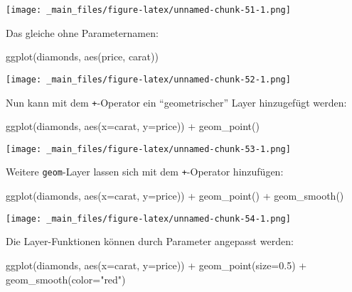 \documentclass[
  ngerman,
]{article}
\newenvironment{Shaded}{\begin{snugshade}}{\end{snugshade}}
\newcommand{\AttributeTok}[1]{\textcolor[rgb]{0.77,0.63,0.00}{#1}}
\newcommand{\FloatTok}[1]{\textcolor[rgb]{0.00,0.00,0.81}{#1}}
\newcommand{\FunctionTok}[1]{\textcolor[rgb]{0.00,0.00,0.00}{#1}}
\newcommand{\NormalTok}[1]{#1}
\newcommand{\SpecialCharTok}[1]{\textcolor[rgb]{0.00,0.00,0.00}{#1}}
\newcommand{\StringTok}[1]{\textcolor[rgb]{0.31,0.60,0.02}{#1}}
\begin{document}
\texttt{[image: \_main\_files/figure-latex/unnamed-chunk-51-1.png]}

Das gleiche ohne Parameternamen:

\begin{Shaded}
\begin{Highlighting}[]
\FunctionTok{ggplot}\NormalTok{(diamonds, }\FunctionTok{aes}\NormalTok{(price, carat))}
\end{Highlighting}
\end{Shaded}

\texttt{[image: \_main\_files/figure-latex/unnamed-chunk-52-1.png]}

Nun kann mit dem \texttt{+}-Operator ein ``geometrischer'' Layer hinzugefügt werden:

\begin{Shaded}
\begin{Highlighting}[]
\FunctionTok{ggplot}\NormalTok{(diamonds, }\FunctionTok{aes}\NormalTok{(}\AttributeTok{x=}\NormalTok{carat, }\AttributeTok{y=}\NormalTok{price)) }\SpecialCharTok{+}
  \FunctionTok{geom\_point}\NormalTok{()}
\end{Highlighting}
\end{Shaded}

\texttt{[image: \_main\_files/figure-latex/unnamed-chunk-53-1.png]}

Weitere \texttt{geom}-Layer lassen sich mit dem \texttt{+}-Operator hinzufügen:

\begin{Shaded}
\begin{Highlighting}[]
\FunctionTok{ggplot}\NormalTok{(diamonds, }\FunctionTok{aes}\NormalTok{(}\AttributeTok{x=}\NormalTok{carat, }\AttributeTok{y=}\NormalTok{price)) }\SpecialCharTok{+}
  \FunctionTok{geom\_point}\NormalTok{() }\SpecialCharTok{+}
  \FunctionTok{geom\_smooth}\NormalTok{()}
\end{Highlighting}
\end{Shaded}

\texttt{[image: \_main\_files/figure-latex/unnamed-chunk-54-1.png]}

Die Layer-Funktionen können durch Parameter angepasst werden:

\begin{Shaded}
\begin{Highlighting}[]
\FunctionTok{ggplot}\NormalTok{(diamonds, }\FunctionTok{aes}\NormalTok{(}\AttributeTok{x=}\NormalTok{carat, }\AttributeTok{y=}\NormalTok{price)) }\SpecialCharTok{+}
  \FunctionTok{geom\_point}\NormalTok{(}\AttributeTok{size=}\FloatTok{0.5}\NormalTok{) }\SpecialCharTok{+}
  \FunctionTok{geom\_smooth}\NormalTok{(}\AttributeTok{color=}\StringTok{"red"}\NormalTok{)}
\end{Highlighting}
\end{Shaded}
\end{document}
